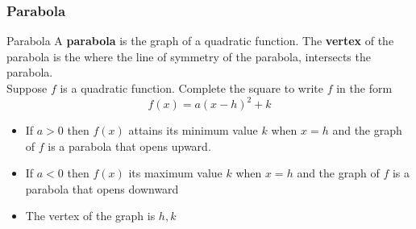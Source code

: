 \documentclass{beamer}
\begin{document}
  \begin{frame}
    \frametitle{Parabola}
    \begin{block}{Parabola}
      A \textbf{parabola} is the graph of a quadratic function. The \textbf{vertex} of the parabola is the where the line of symmetry of the parabola, intersects the parabola. \\ 

      \bigskip 
      Suppose \(f\) is a quadratic function. Complete the square to write \(f\) in the form 
      \[ f(x) = a(x-h)^{2} + k \] 
      \begin{itemize}
        \item If \(a > 0\) then \(f(x)\) attains its minimum value \(k\) when \(x=h\) and the graph of \(f\) is a parabola that opens upward.
        \item If \(a < 0 \) then \(f(x) \) its maximum value \(k\) when \(x=h\) and the graph of \(f\) is a parabola that opens downward 
        \item The vertex of the graph is \(h,k\)
      \end{itemize}

    \end{block}
  \end{frame}
\end{document}
